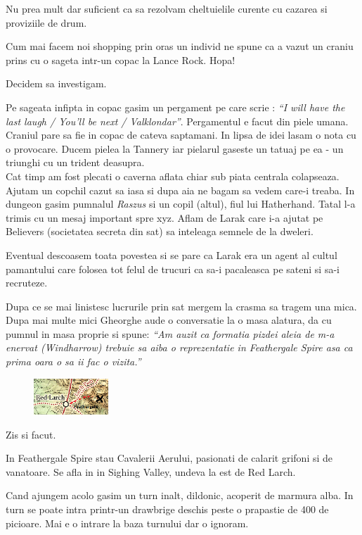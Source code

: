 \documentclass[12pt,oneside]{book}
\begin{document}
Nu prea mult dar suficient ca sa rezolvam cheltuielile curente cu cazarea 
si proviziile de drum.

Cum mai facem noi shopping prin oras un individ ne spune ca a vazut un 
craniu prins cu o sageta intr-un copac la Lance Rock. Hopa! 

Decidem sa investigam. 

Pe sageata infipta in copac gasim un pergament pe care scrie : \textit{``I will 
have the last laugh / You'll be next / Valklondar''}. Pergamentul e
facut din piele umana. Craniul pare sa fie in copac de cateva saptamani. In 
lipsa de idei lasam o nota cu o provocare. Ducem pielea la Tannery iar 
pielarul gaseste un tatuaj pe ea - un triunghi cu un trident deasupra.
\\
Cat timp am fost plecati o caverna aflata chiar sub piata centrala 
colapseaza. Ajutam un copchil cazut sa iasa si dupa aia ne bagam sa vedem 
care-i treaba. In dungeon gasim pumnalul \textit{Raszus} si un copil (altul), 
fiul lui Hatherhand. Tatal l-a trimis cu un mesaj important spre xyz. Aflam 
de Larak care i-a ajutat pe Believers (societatea secreta din sat) sa 
inteleaga semnele de la dweleri.

Eventual descoasem toata povestea si se pare ca Larak era un agent al cultul 
pamantului care folosea tot felul de trucuri ca sa-i pacaleasca pe sateni 
si sa-i recruteze.

Dupa ce se mai linistesc lucrurile prin sat mergem la crasma sa tragem 
una mica. Dupa mai multe mici Gheorghe aude o conversatie la o masa 
alatura, da cu pumnul in masa proprie si spune:
\textit{``Am auzit ca formatia pizdei aleia de m-a enervat (Windharrow) 
trebuie sa aiba o reprezentatie in Feathergale Spire  asa ca prima oara o 
sa ii fac o vizita.''}

\begin{figure}
    \centering
    \includegraphics[width=0.25\textwidth]{images/maps/path-to-feathergale-spire}
\end{figure}

Zis si facut.

In Feathergale Spire stau Cavalerii Aerului, pasionati de calarit grifoni si de 
vanatoare. Se afla in in Sighing Valley, undeva la est de Red Larch.

Cand ajungem acolo gasim un turn inalt, dildonic, acoperit de marmura alba. 
In turn se poate intra printr-un drawbrige deschis peste o prapastie de 
400 de picioare. Mai e o intrare la baza turnului dar o ignoram.
\end{document}
